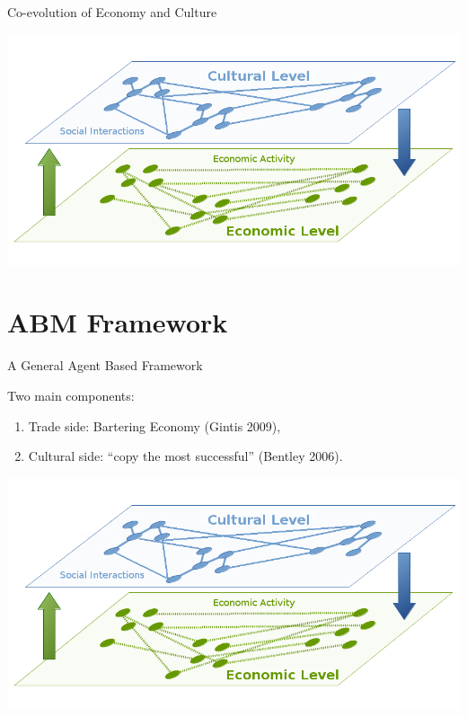 \documentclass[12pt, handout=show,notes=show]{beamer}
\begin{document}
\begin{frame}{Co-evolution of Economy and Culture}

    \begin{center}
	\includegraphics[width=\textwidth]{images/interaction}	
    \end{center}

\end{frame}

\section{ABM Framework}




\begin{frame}{A General Agent Based Framework }

     Two main components:
     \vfill
    \begin{enumerate}
	\item Trade side: Bartering Economy (Gintis 2009),
	\item Cultural side: ``copy the most successful'' (Bentley 2006).
    \end{enumerate}
    \begin{center}
	\includegraphics[width=.8\textwidth]{images/interaction}	
    \end{center}
\end{frame}
	
\end{document}
